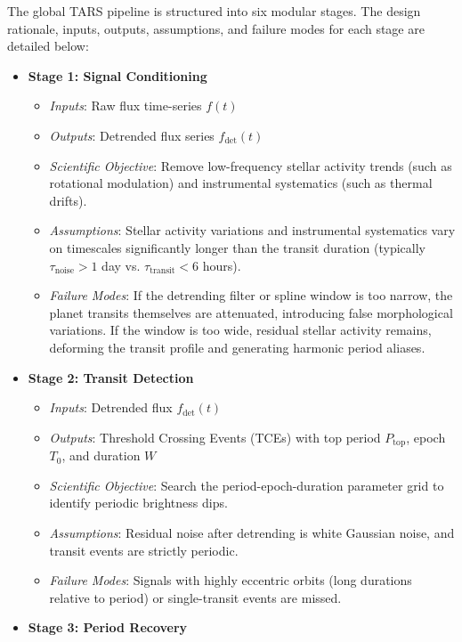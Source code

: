 The global TARS pipeline is structured into six modular stages. The design rationale, inputs, outputs, assumptions, and failure modes for each stage are detailed below:
\begin{itemize}
\item \textbf{Stage 1: Signal Conditioning}
    \begin{itemize}
    \item \textit{Inputs}: Raw flux time-series $f(t)$
    \item \textit{Outputs}: Detrended flux series $f_{\text{det}}(t)$
    \item \textit{Scientific Objective}: Remove low-frequency stellar activity trends (such as rotational modulation) and instrumental systematics (such as thermal drifts).
    \item \textit{Assumptions}: Stellar activity variations and instrumental systematics vary on timescales significantly longer than the transit duration (typically $\tau_{\text{noise}} > 1$ day vs. $\tau_{\text{transit}} < 6$ hours).
    \item \textit{Failure Modes}: If the detrending filter or spline window is too narrow, the planet transits themselves are attenuated, introducing false morphological variations. If the window is too wide, residual stellar activity remains, deforming the transit profile and generating harmonic period aliases.
    \end{itemize}
\item \textbf{Stage 2: Transit Detection}
    \begin{itemize}
    \item \textit{Inputs}: Detrended flux $f_{\text{det}}(t)$
    \item \textit{Outputs}: Threshold Crossing Events (TCEs) with top period $P_{\text{top}}$, epoch $T_0$, and duration $W$
    \item \textit{Scientific Objective}: Search the period-epoch-duration parameter grid to identify periodic brightness dips.
    \item \textit{Assumptions}: Residual noise after detrending is white Gaussian noise, and transit events are strictly periodic.
    \item \textit{Failure Modes}: Signals with highly eccentric orbits (long durations relative to period) or single-transit events are missed.
    \end{itemize}
\item \textbf{Stage 3: Period Recovery}
    \begin{itemize}

\end{itemize}
\end{itemize}
